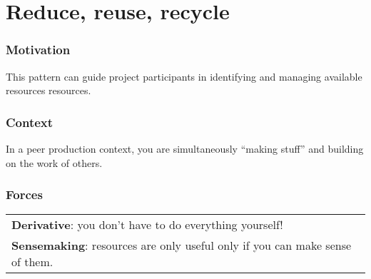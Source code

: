 \section{Reduce, reuse, recycle} \label{sec:Reduce, reuse, recycle}

\subsubsection*{Motivation} This pattern can guide project participants in identifying and managing available resources resources.


\subsubsection*{Context}
In a peer production context, you are simultaneously ``making stuff'' and building on the work of others.

\subsubsection*{Forces}
\raisebox{-1\baselineskip}
{{\centering
\begin{tabular}{p{}}
\textbf{Derivative}: you don't have to do everything yourself!\\
\textbf{Sensemaking}: resources are only useful only if you can make sense of them.\\
\end{tabular}
}}

